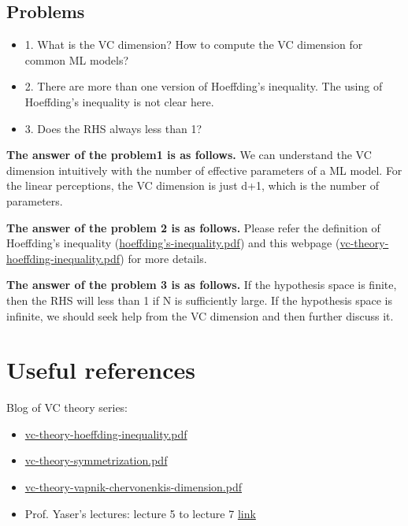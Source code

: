 \documentclass{article}
\begin{document}
\subsection{Problems}
\begin{itemize}
    \item 1. What is the VC dimension? How to compute the VC dimension for common ML models?
    \item 2. There are more than one version of Hoeffding's inequality. The using of Hoeffding's inequality is not clear here.
    \item 3. Does the RHS always less than 1?
\end{itemize}

\textbf{The answer of the problem1 is as follows.}
We can understand the VC dimension intuitively with the number of effective parameters of a ML model.
For the linear perceptions, the VC dimension is just d+1, which is the number of parameters.

\textbf{The answer of the problem 2 is as follows.}
Please refer the definition of Hoeffding's inequality (\href{attachments/hoeffding's-inequality.pdf}{hoeffding's-inequality.pdf}) and this webpage (\href{attachments/vc-theory-hoeffding-inequality.pdf}{vc-theory-hoeffding-inequality.pdf}) for more details.

\textbf{The answer of the problem 3 is as follows.}
If the hypothesis space is finite, then the RHS will less than 1 if N is sufficiently large. If the hypothesis space is infinite, we should seek help from the VC dimension and then further discuss it.

\section{Useful references}
Blog of VC theory series: 
\begin{itemize}
    \item \href{attachments/vc-theory-hoeffding-inequality.pdf}{vc-theory-hoeffding-inequality.pdf}
    \item \href{attachments/vc-theory-symmetrization.pdf}{vc-theory-symmetrization.pdf}
    \item \href{attachments/vc-theory-vapnik-chervonenkis-dimension.pdf}{vc-theory-vapnik-chervonenkis-dimension.pdf}
    \item Prof. Yaser's lectures: lecture 5 to lecture 7 \href{https://www.youtube.com/results?search_query=yaser+learning+from+data}{link}
\end{itemize}
\end{document}
